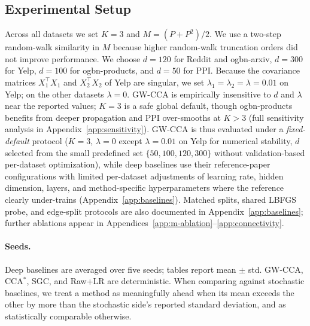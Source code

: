 \documentclass{article}
\begin{document}
\subsection{Experimental Setup}
Across all datasets we set $K = 3$ and $M = (P + P^2)/2$. We
use a two-step random-walk similarity in $M$ because higher random-walk
truncation orders did not improve performance. We choose $d = 120$ for Reddit and
ogbn-arxiv, $d = 300$ for Yelp, $d = 100$ for ogbn-products, and $d = 50$
for PPI. Because the covariance matrices $X_1^\top X_1$ and $X_2^\top X_2$
of Yelp are singular, we set $\lambda_1 = \lambda_2 = \lambda = 0.01$ on
Yelp; on the other datasets $\lambda = 0$. GW-CCA is empirically
insensitive to $d$ and $\lambda$ near the reported values; $K
= 3$ is a safe global default, though ogbn-products benefits from
deeper propagation and PPI over-smooths at $K > 3$ (full sensitivity
analysis in Appendix~\ref{app:sensitivity}). GW-CCA is thus
evaluated under a \emph{fixed-default} protocol ($K = 3$, $\lambda = 0$
except $\lambda = 0.01$ on Yelp for numerical stability, $d$ selected
from the small predefined set $\{50, 100, 120, 300\}$ without
validation-based per-dataset optimization), while deep baselines use
their reference-paper configurations with limited per-dataset
adjustments of learning rate, hidden dimension, layers, and
method-specific hyperparameters where the reference clearly
under-trains (Appendix~\ref{app:baselines}). Matched splits, shared LBFGS probe, and edge-split
protocols are also documented in Appendix~\ref{app:baselines};
further ablations appear in Appendices~\ref{app:m-ablation}--\ref{app:connectivity}.

\paragraph{Seeds.}
Deep baselines are averaged over five seeds; tables report mean $\pm$ std.
GW-CCA, CCA$^\ast$, SGC, and Raw+LR are deterministic. When comparing
against stochastic baselines, we treat a method as meaningfully ahead
when its mean exceeds the other by more than the stochastic side's
reported standard deviation, and as statistically comparable otherwise.
\end{document}
